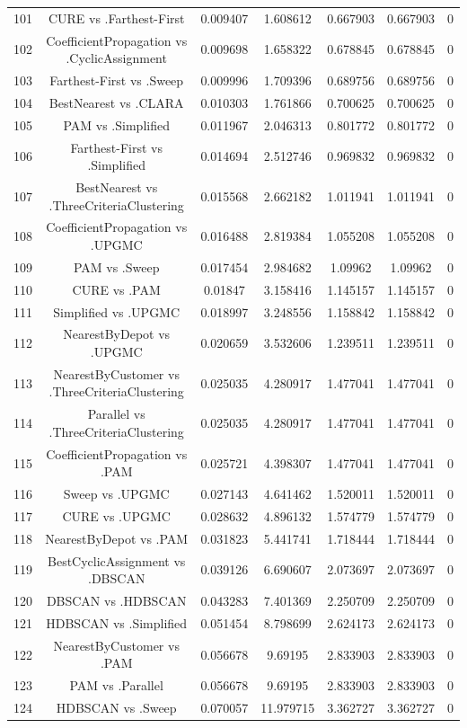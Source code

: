 \documentclass[a4paper,10pt]{article}
\begin{document}
\begin{landscape}
\begin{table}[!htp]
\begin{tabular}{ccccccc}
101&CURE vs .Farthest-First&0.009407&1.608612&0.667903&0.667903&0\\
102&CoefficientPropagation vs .CyclicAssignment&0.009698&1.658322&0.678845&0.678845&0\\
103&Farthest-First vs .Sweep&0.009996&1.709396&0.689756&0.689756&0\\
104&BestNearest vs .CLARA&0.010303&1.761866&0.700625&0.700625&0\\
105&PAM vs .Simplified&0.011967&2.046313&0.801772&0.801772&0\\
106&Farthest-First vs .Simplified&0.014694&2.512746&0.969832&0.969832&0\\
107&BestNearest vs .ThreeCriteriaClustering&0.015568&2.662182&1.011941&1.011941&0\\
108&CoefficientPropagation vs .UPGMC&0.016488&2.819384&1.055208&1.055208&0\\
109&PAM vs .Sweep&0.017454&2.984682&1.09962&1.09962&0\\
110&CURE vs .PAM&0.01847&3.158416&1.145157&1.145157&0\\
111&Simplified vs .UPGMC&0.018997&3.248556&1.158842&1.158842&0\\
112&NearestByDepot vs .UPGMC&0.020659&3.532606&1.239511&1.239511&0\\
113&NearestByCustomer vs .ThreeCriteriaClustering&0.025035&4.280917&1.477041&1.477041&0\\
114&Parallel vs .ThreeCriteriaClustering&0.025035&4.280917&1.477041&1.477041&0\\
115&CoefficientPropagation vs .PAM&0.025721&4.398307&1.477041&1.477041&0\\
116&Sweep vs .UPGMC&0.027143&4.641462&1.520011&1.520011&0\\
117&CURE vs .UPGMC&0.028632&4.896132&1.574779&1.574779&0\\
118&NearestByDepot vs .PAM&0.031823&5.441741&1.718444&1.718444&0\\
119&BestCyclicAssignment vs .DBSCAN&0.039126&6.690607&2.073697&2.073697&0\\
120&DBSCAN vs .HDBSCAN&0.043283&7.401369&2.250709&2.250709&0\\
121&HDBSCAN vs .Simplified&0.051454&8.798699&2.624173&2.624173&0\\
122&NearestByCustomer vs .PAM&0.056678&9.69195&2.833903&2.833903&0\\
123&PAM vs .Parallel&0.056678&9.69195&2.833903&2.833903&0\\
124&HDBSCAN vs .Sweep&0.070057&11.979715&3.362727&3.362727&0\\

\end{tabular}
\end{table}
\end{landscape}
\end{document}
